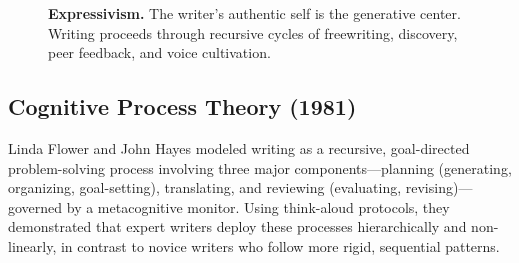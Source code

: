 \documentclass[12pt]{article}
\begin{document}
\begin{figure}[H]
\caption{\textbf{Expressivism.} The writer's authentic self is the generative center. Writing proceeds through recursive cycles of freewriting, discovery, peer feedback, and voice cultivation.}
\label{fig:expressivism-model}
\end{figure}

\subsection{Cognitive Process Theory (1981)}

Linda Flower and John Hayes modeled writing as a recursive, goal-directed problem-solving process involving three major components---planning (generating, organizing, goal-setting), translating, and reviewing (evaluating, revising)---governed by a metacognitive monitor. Using think-aloud protocols, they demonstrated that expert writers deploy these processes hierarchically and non-linearly, in contrast to novice writers who follow more rigid, sequential patterns.
\end{document}
